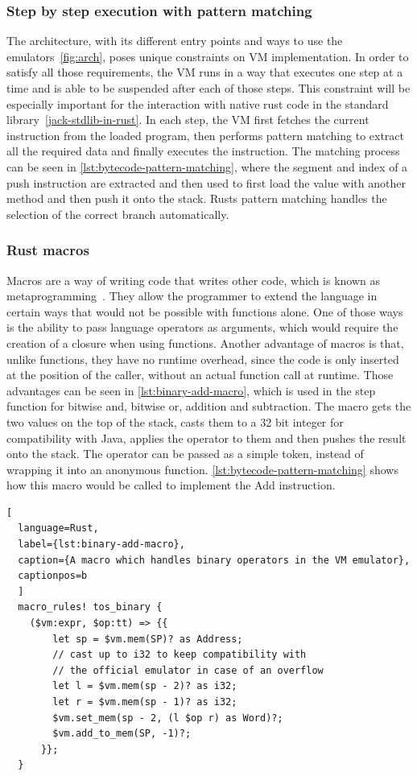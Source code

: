 \subsubsection{Step by step execution with pattern matching} \label{step-by-step}
The architecture, with its different entry points and ways to use the emulators~\ref{fig:arch}, poses unique constraints on VM implementation. In order to satisfy all those requirements, the VM runs in a way that executes one step at a time and is able to be suspended after each of those steps. This constraint will be especially important for the interaction with native rust code in the standard library~\ref{jack-stdlib-in-rust}.
In each step, the VM first fetches the current instruction from the loaded program, then performs pattern matching to extract all the required data and finally executes the instruction.
The matching process can be seen in \cref{lst:bytecode-pattern-matching}, where the segment and index of a push instruction are extracted and then used to first load the value with another method and then push it onto the stack.
Rusts pattern matching handles the selection of the correct branch automatically.

\subsubsection{Rust macros} \label{macros}
Macros are a way of writing code that writes other code, which is known as metaprogramming~\cite[Chapter~19.5]{klabnik2019rust}.
They allow the programmer to extend the language in certain ways that would not be possible with functions alone.
One of those ways is the ability to pass language operators as arguments, which would require the creation of a closure when using functions.
Another advantage of macros is that, unlike functions, they have no runtime overhead, since the code is only inserted at the position of the caller, without an actual function call at runtime.
Those advantages can be seen in \cref{lst:binary-add-macro}, which is used in the step function for bitwise and, bitwise or, addition and subtraction. The macro gets the two values on the top of the stack, casts them to a 32 bit integer for compatibility with Java, applies the operator to them and then pushes the result onto the stack.
The operator can be passed as a simple token, instead of wrapping it into an anonymous function.
\cref{lst:bytecode-pattern-matching} shows how this macro would be called to implement the Add instruction.

\begin{lstlisting}[
  language=Rust,
  label={lst:binary-add-macro},
  caption={A macro which handles binary operators in the VM emulator},
  captionpos=b
  ]
  macro_rules! tos_binary {
    ($vm:expr, $op:tt) => {{
        let sp = $vm.mem(SP)? as Address;
        // cast up to i32 to keep compatibility with
        // the official emulator in case of an overflow
        let l = $vm.mem(sp - 2)? as i32;
        let r = $vm.mem(sp - 1)? as i32;
        $vm.set_mem(sp - 2, (l $op r) as Word)?;
        $vm.add_to_mem(SP, -1)?;
      }};
  }
\end{lstlisting}


